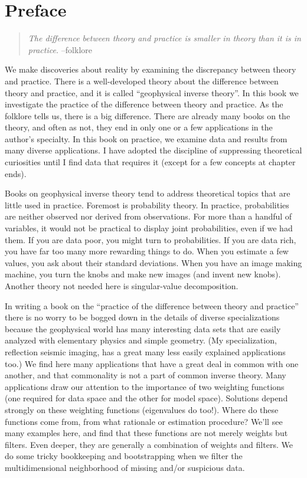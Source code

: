 \chapter*{Preface}

\begin{quote}
\emph{The difference between theory and practice is smaller in theory than it is in
  practice.} --folklore
\end{quote}

We make discoveries about reality by examining the discrepancy between
theory and practice.  There is a well-developed theory about the
difference between theory and practice, and it is called ``geophysical
inverse theory''. In this book we investigate the practice of the
difference between theory and practice. As the folklore tells us,
there is a big difference. There are already many books on the theory,
and often as not, they end in only one or a few applications in the
author's specialty. In this book on practice, we examine data and
results from many diverse applications. I have adopted the discipline
of suppressing theoretical curiosities until I find data that requires
it (except for a few concepts at chapter ends).

Books on geophysical inverse theory tend to address theoretical topics
that are little used in practice. Foremost is probability theory. In
practice, probabilities are neither observed nor derived from
observations. For more than a handful of variables, it would not be
practical to display joint probabilities, even if we had them. If you
are data poor, you might turn to probabilities. If you are data rich,
you have far too many more rewarding things to do. When you estimate a
few values, you ask about their standard deviations. When you have an
image making machine, you turn the knobs and make new images (and
invent new knobs). Another theory not needed here is singular-value
decomposition.

In writing a book on the ``practice of the difference between theory
and practice'' there is no worry to be bogged down in the details of
diverse specializations because the geophysical world has many
interesting data sets that are easily analyzed with elementary physics
and simple geometry. (My specialization, reflection seismic imaging,
has a great many less easily explained applications too.) We find here
many applications that have a great deal in common with one another,
and that commonality is not a part of common inverse theory. Many
applications draw our attention to the importance of two weighting
functions (one required for data space and the other for model
space). Solutions depend strongly on these weighting functions
(eigenvalues do too!). Where do these functions come from, from what
rationale or estimation procedure? We'll see many examples here, and
find that these functions are not merely weights but filters. Even
deeper, they are generally a combination of weights and filters.  We
do some tricky bookkeeping and bootstrapping when we filter the
multidimensional neighborhood of missing and/or suspicious data.

